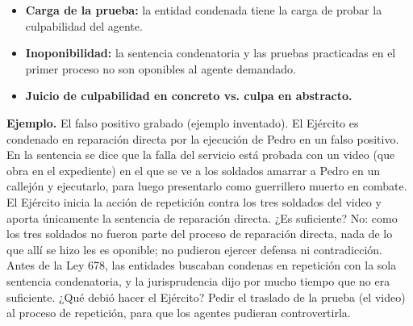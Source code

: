 \begin{itemize}
\item \textbf{Carga de la prueba:} la entidad condenada tiene la carga de probar la culpabilidad del agente.
\item \textbf{Inoponibilidad:} la sentencia condenatoria y las pruebas practicadas en el primer proceso no son oponibles al agente demandado.
\item \textbf{Juicio de culpabilidad en concreto vs. culpa en abstracto.}
\end{itemize}
\begin{ejemplo}
\textcolor[HTML]{4F6228}{\textbf{Ejemplo. }}El falso positivo grabado (ejemplo inventado). El Ejército es condenado en reparación directa por la ejecución de Pedro en un falso positivo. En la sentencia se dice que la falla del servicio está probada con un video (que obra en el expediente) en el que se ve a los soldados amarrar a Pedro en un callejón y ejecutarlo, para luego presentarlo como guerrillero muerto en combate. El Ejército inicia la acción de repetición contra los tres soldados del video y aporta únicamente la sentencia de reparación directa. ¿Es suficiente? No: como los tres soldados no fueron parte del proceso de reparación directa, nada de lo que allí se hizo les es oponible; no pudieron ejercer defensa ni contradicción. Antes de la Ley 678, las entidades buscaban condenas en repetición con la sola sentencia condenatoria, y la jurisprudencia dijo por mucho tiempo que no era suficiente. ¿Qué debió hacer el Ejército? Pedir el traslado de la prueba (el video) al proceso de repetición, para que los agentes pudieran controvertirla.
\end{ejemplo}
